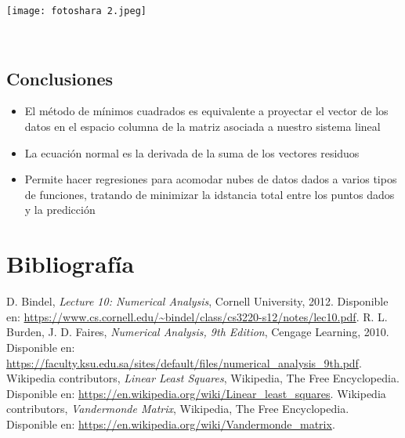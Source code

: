 \documentclass[12pt]{article}
\begin{document}
\texttt{[image: fotoshara 2.jpeg]}

\\

\begin{center}
    \section{Conclusiones} 
\end{center}
\begin{itemize}
\item El m\'etodo de m\'inimos cuadrados es equivalente a proyectar el vector de los datos en el espacio columna de la matriz asociada a nuestro sistema lineal

\item La ecuaci\'on normal es la derivada de la suma de los vectores residuos

\item Permite hacer regresiones para acomodar nubes de datos dados a varios tipos de funciones, tratando de minimizar la idstancia total entre los puntos dados y la predicción
    
\end{itemize}

\section{Bibliografía}
\begin{thebibliography}{9}
     D. Bindel, \textit{Lecture 10: Numerical Analysis}, Cornell University, 2012. Disponible en: \url{https://www.cs.cornell.edu/~bindel/class/cs3220-s12/notes/lec10.pdf}.
     R. L. Burden, J. D. Faires, \textit{Numerical Analysis, 9th Edition}, Cengage Learning, 2010. Disponible en: \url{https://faculty.ksu.edu.sa/sites/default/files/numerical_analysis_9th.pdf}.
     Wikipedia contributors, \textit{Linear Least Squares}, Wikipedia, The Free Encyclopedia. Disponible en: \url{https://en.wikipedia.org/wiki/Linear_least_squares}.
     Wikipedia contributors, \textit{Vandermonde Matrix}, Wikipedia, The Free Encyclopedia. Disponible en: \url{https://en.wikipedia.org/wiki/Vandermonde_matrix}.
\end{thebibliography}
\end{document}
